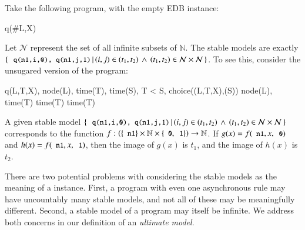 \begin{example}
\label{ex:uncountable}
Take the following \lang program, with the empty EDB instance:

\begin{Drules}
        {q(#L,X)}
\end{Drules}

Let $\mathcal{N}$ represent the set of all infinite subsets of $\mathbb{N}$.
The stable models are exactly $\{ \, \dedalus{q(n1,i,0), q(n1,j,1)} \, | \, (i,j) \in (t_1, t_2) \, \land \, (t_1, t_2) \in \mathcal{N}
\times \mathcal{N} \, \}$.  To see this, consider the unsugared version of the program:

\begin{Drules}
        {q(L,T,X), node(L), time(T), time(S), T < S, choice((L,T,X),(S))}
        {node(L), time(T)}
        {time(T)}
        {time(T)}
\end{Drules}

A given stable model $\{ \, \dedalus{q(n1,i,0), q(n1,j,1)} \, | \, (i,j)\in (t_1, t_2) \, \land \, (t_1, t_2)\in \mathcal{N}                                                    
\times \mathcal{N} \, \}$ corresponds to the function $f : \left(\{\dedalus{n1}\} \times \mathbb{N} \times \{\dedalus{0},\dedalus{1}\}\right) \rightarrow \mathbb{N}$.  If $g(x) = f(\dedalus{n1}, x, \dedalus{0})$ and $h(x) = f(\dedalus{n1}, x, \dedalus{1})$, then the image of $g(x)$ is $t_1$, and the image of $h(x)$ is $t_2$.
\end{example}


There are two potential problems with considering the stable models as the meaning of a \lang instance.  
First, a program with even one asynchronous rule may have uncountably many stable models, and not all of these may be meaningfully different.  Second, a stable model of a \lang program may itself be infinite.  We address both concerns in our definition of an {\em ultimate model}.

